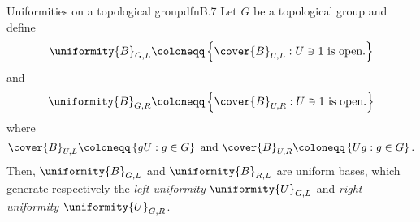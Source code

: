 \begin{prp}{Uniformities on a topological group}{dfnB.7}
Let $G$ be a topological group and define
\begin{equation}\label{B.8}
\uniformity{B}_{G,L}\coloneqq \left\{ \cover{B}_{U,L}:U\ni 1\text{ is open.}\right\}
\end{equation}
and
\begin{equation}
\uniformity{B}_{G,R}\coloneqq \left\{ \cover{B}_{U,R}:U\ni 1\text{ is open.}\right\} 
\end{equation}
where
\begin{equation}\label{1.9}
\cover{B}_{U,L}\coloneqq \left\{ gU:g\in G\right\} \text{ and }\cover{B}_{U,R}\coloneqq \left\{ Ug:g\in G\right\} .
\end{equation}
Then, $\uniformity{B}_{G,L}$ and $\uniformity{B}_{R,L}$ are uniform bases, which generate respectively the \emph{left uniformity} $\uniformity{U}_{G,L}$ and \emph{right uniformity} $\uniformity{U}_{G,R}$.


\end{prp}
